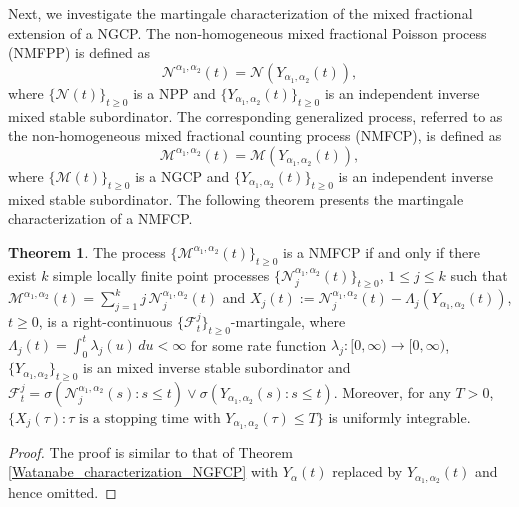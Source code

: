 \documentclass[11pt,oneside,reqno]{amsart}
\theoremstyle{definition}
\newtheorem{theorem}{\bf Theorem}[section]
\newtheorem{corollary}{Corollary}[section]
\theoremstyle{remarkstyle}
\begin{document}
Next, we investigate the martingale characterization of the mixed fractional extension of a NGCP. The non-homogeneous mixed fractional Poisson process (NMFPP) is defined as
\begin{equation*}
    \mathcal{N}^{\alpha_1,\alpha_2}(t)=\mathcal{N}\left(Y_{\alpha_1,\alpha_2}(t)\right),
\end{equation*}
where $\{\mathcal{N}(t)\}_{t\ge 0}$ is a NPP and $\{Y_{\alpha_1,\alpha_2}(t)\}_{t \ge 0}$ is an independent inverse mixed stable subordinator. The corresponding generalized process, referred to as the non-homogeneous mixed fractional counting process (NMFCP), is defined as
\begin{equation*}\label{definition_NMFCP}
    \mathcal{M}^{\alpha_1,\alpha_2}(t)=\mathcal{M}\left(Y_{\alpha_1,\alpha_2}(t)\right),
\end{equation*}
where $\{\mathcal{M}(t)\}_{t\ge 0}$ is a NGCP and $\{Y_{\alpha_1,\alpha_2}(t)\}_{t\ge 0}$ is an independent inverse mixed stable subordinator. The following theorem presents the martingale characterization of a NMFCP.
\begin{theorem}\label{martingale_characterization_NMFCP}
    The process $\{\mathcal{M}^{\alpha_1,\alpha_2}(t)\}_{t\ge0}$ is a NMFCP if and only if there exist $k$ simple locally finite point processes $\{\mathcal{N}_j^{\alpha_1,\alpha_2}(t)\}_{t\ge0}$, $1\le j\le k$ such that $\mathcal{M}^{\alpha_1,\alpha_2}(t)=\sum_{j=1}^{k}j\,\mathcal{N}_j^{\alpha_1,\alpha_2}(t)$ and $X_j(t):=\mathcal{N}_j^{\alpha_1,\alpha_2}(t)-\Lambda_j(Y_{\alpha_1,\alpha_2}(t))$, $t\ge0$, is a right-continuous $\{\mathcal{F}_t^j\}_{t\ge 0}$-martingale, where $\Lambda_j(t)=\int_0^t \lambda_j(u)\,du<\infty$ for some rate function $\lambda_j:[0,\infty)\to[0,\infty)$, $\{Y_{\alpha_1,\alpha_2}\}_{t\ge 0}$ is an mixed inverse stable subordinator and  $\mathcal{F}_t^j=\sigma(\mathcal{N}_j^{\alpha_1,\alpha_2}(s):s\le t)\vee\sigma(Y_{\alpha_1,\alpha_2}(s):s\le t)$. Moreover, for any $T>0$, $\{X_j(\tau): \tau \text{ is a stopping time with } Y_{\alpha_1,\alpha_2}(\tau)\le T\}$ is uniformly integrable.
\end{theorem}
\begin{proof}
    The proof is similar to that of Theorem \ref{Watanabe_characterization_NGFCP} with $Y_{\alpha}(t)$ replaced by $Y_{\alpha_1,\alpha_2}(t)$ and hence omitted.
\end{proof}
\end{document}
